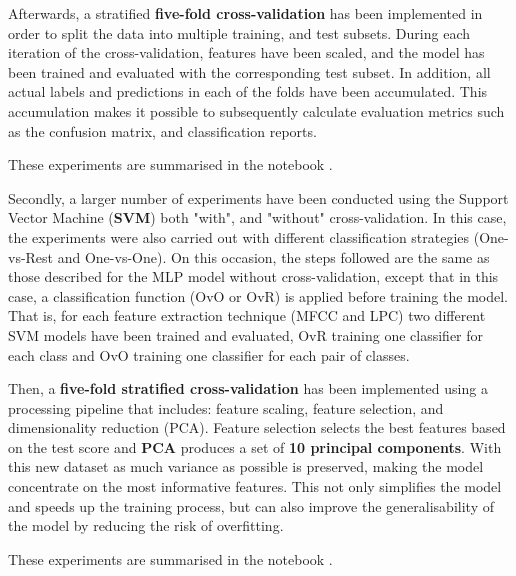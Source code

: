 Afterwards, a stratified \textbf{five-fold cross-validation} has been implemented in order to split the data into multiple training, and test subsets. During each iteration of the cross-validation, features have been scaled, and the model has been trained and evaluated with the corresponding test subset. In addition, all actual labels and predictions in each of the folds have been accumulated. This accumulation makes it possible to subsequently calculate evaluation metrics such as the confusion matrix, and classification reports. 

These experiments are summarised in the notebook  .

Secondly, a larger number of experiments have been conducted using the Support Vector Machine (\textbf{SVM}) both "with", and "without" cross-validation. In this case, the experiments were also carried out with different classification strategies (One-vs-Rest and One-vs-One). On this occasion, the steps followed are the same as those described for the MLP model without cross-validation, except that in this case, a classification function (OvO or OvR) is applied before training the model. That is, for each feature extraction technique (MFCC and LPC) two different SVM models have been trained and evaluated, OvR training one classifier for each class and OvO training one classifier for each pair of classes.

Then, a \textbf{five-fold stratified cross-validation} has been implemented using a processing pipeline that includes: feature scaling, feature selection, and dimensionality reduction (PCA). Feature selection selects the best features based on the test score and \textbf{PCA} produces a set of \textbf{10 principal components}. With this new dataset as much variance as possible is preserved, making the model concentrate on the most informative features. This not only simplifies the model and speeds up the training process, but can also improve the generalisability of the model by reducing the risk of overfitting. 

These experiments are summarised in the notebook .

